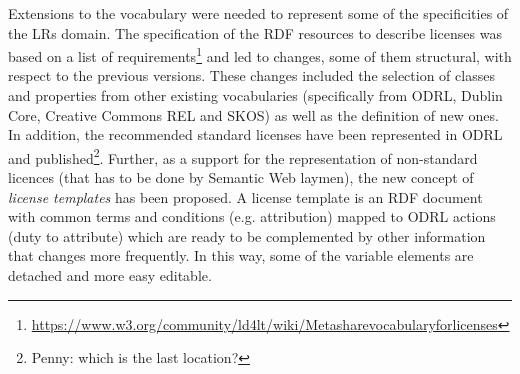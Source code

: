 \documentclass{llncs}
\begin{document}
{Extensions to the vocabulary were needed to represent some of the specificities of the LRs domain. The specification of the RDF resources to describe licenses was based on a list of requirements\footnote{\url{https://www.w3.org/community/ld4lt/wiki/Metasharevocabularyforlicenses}} and led to changes, some of them structural, with respect to the previous versions. These changes included the selection of classes and properties from other existing vocabularies (specifically from ODRL, Dublin Core, Creative Commons REL and SKOS) as well as the definition of new ones.
In addition, the recommended standard licenses have been represented in ODRL and published\footnote{Penny: which is the last location?}. Further, as a support for the representation of non-standard licences (that has to be done by Semantic Web laymen), the new concept of \textit{license templates} has been proposed. A license template is an RDF document with common terms and conditions (e.g. attribution) mapped to ODRL actions (duty to attribute) which are ready to be complemented by other information that changes more frequently. In this way, some of the variable elements are detached and more easy editable.
}
\end{document}
